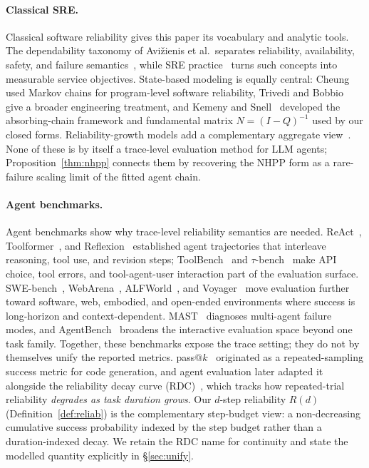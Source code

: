 \paragraph{Classical SRE.}
Classical software reliability gives this paper its vocabulary and
analytic tools. The dependability taxonomy of Avi{\v z}ienis et al.\
separates reliability, availability, safety, and failure
semantics~\cite{avizienis2004dependability}, while SRE
practice~\cite{beyer2016sre} turns such concepts into measurable
service objectives. State-based modeling is equally central:
Cheung~\cite{cheung1980} used Markov chains for program-level software
reliability, Trivedi and Bobbio~\cite{trivedi2017reliability} give a
broader engineering treatment, and Kemeny and Snell~\cite{kemenysnell}
developed the absorbing-chain framework and fundamental matrix
$N=(I-Q)^{-1}$ used by our closed forms. Reliability-growth models add
a complementary aggregate view~\cite{goelokt,musa1987}. None of these
is by itself a trace-level evaluation method for LLM agents;
Proposition~\ref{thm:nhpp} connects them by recovering the NHPP form as
a rare-failure scaling limit of the fitted agent chain.

\paragraph{Agent benchmarks.}
Agent benchmarks show why trace-level reliability semantics are
needed. ReAct~\cite{yao2023react}, Toolformer~\cite{schick2023toolformer},
and Reflexion~\cite{shinn2023reflexion} established agent
trajectories that interleave reasoning, tool use, and revision steps;
ToolBench~\cite{qin2023toolllm} and $\tau$-bench~\cite{taub2024} make
API choice, tool errors, and tool-agent-user interaction part of the
evaluation surface. SWE-bench~\cite{swebench2024},
WebArena~\cite{zhou2023webarena}, ALFWorld~\cite{shridhar2021alfworld},
and Voyager~\cite{wang2023voyager} move evaluation further toward
software, web, embodied, and open-ended environments where success is
long-horizon and context-dependent. MAST~\cite{mast2025} diagnoses
multi-agent failure modes, and AgentBench~\cite{agentbench2024}
broadens the interactive evaluation space beyond one task family.
Together, these benchmarks expose the trace setting; they do not by
themselves unify the reported metrics. pass$@k$~\cite{chen2021codex}
originated as a repeated-sampling success metric for code generation,
and agent evaluation later adapted it alongside the reliability decay
curve (RDC)~\cite{rdc2025}, which tracks how repeated-trial reliability
\emph{degrades as task duration grows}. Our $d$-step reliability $R(d)$
(Definition~\ref{def:reliab}) is the complementary step-budget view: a
non-decreasing cumulative success probability indexed by the step
budget rather than a duration-indexed decay. We retain the RDC name for
continuity and state the modelled quantity explicitly in
\S\ref{sec:unify}.

